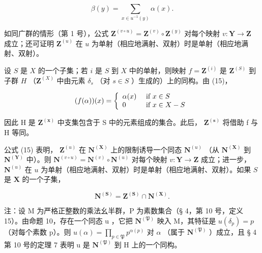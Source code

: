 \[
\beta (y) = \sum_ {x \in u ^ {- 1} (y)} \alpha (x).\tag{15}
\]

如同广群的情形（第 1 号），公式 \(\mathbf{Z}^{(v\circ u)} = \mathbf{Z}^{(v)}\circ \mathbf{Z}^{(y)}\) 对每个映射 \(v\colon \mathbf{Y}\to \mathbf{Z}\) 成立；还可证明 \(\mathbf{Z}^{(u)}\) 在 \(u\) 为单射（相应地满射、双射）时是单射（相应地满射、双射）。

设 \(S\) 是 \(X\) 的一个子集；若 \(i\) 是 \(S\) 到 \(X\) 中的单射，则映射 \(f = \mathbf{Z}^{(i)}\) 是 \(\mathbf{Z}^{(S)}\) 到子群 \(H\) （\(\mathbf{Z}^{(X)}\) 中由元素 \(\delta_s\) （对 \(s \in S\) ）生成的）上的同构。由 (15)，

\[
(f (\alpha)) (x) = \left\{ \begin{array}{l l} \alpha (x) & \text { if } x \in S \\ 0 & \text { if } x \in X - S \end{array} \right.
\]

因此 H 是 \(\mathbf{Z}^{(\mathbf{x})}\) 中支集包含于 S 中的元素组成的集合。此后， \(\mathbf{Z}^{(\mathbf{s})}\) 将借助 f 与 H 等同。

公式 (15) 表明， \(\mathbf{Z}^{(u)}\) 在 \(\mathbf{N}^{(\mathbf{X})}\) 上的限制诱导一个同态 \(\mathbf{N}^{(u)}\) （从 \(\mathbf{N}^{(\mathbf{X})}\) 到 \(\mathbf{N}^{(\mathbf{Y})}\) 中）。则 \(\mathbf{N}^{(v\circ u)} = \mathbf{N}^{(v)}\circ \mathbf{N}^{(u)}\) 对每个映射 \(v\colon \mathbf{Y}\to \mathbf{Z}\) 成立；进一步， \(\mathbf{N}^{(u)}\) 在 \(u\) 为单射（相应地满射、双射）时是单射（相应地满射、双射）。如果 \(S\) 是 \(\mathbf{X}\) 的一个子集，

\[
\mathbf {N} ^ {(\mathbf {S})} = \mathbf {Z} ^ {(\mathbf {S})} \cap \mathbf {N} ^ {(\mathbf {X})}.
\]

注：设 M 为严格正整数的乘法幺半群，P 为素数集合（§ 4，第 10 号，定义 15）。由命题 10，存在一个同态 u ，它把 \(\mathbf{N}^{(\mathfrak{P})}\) 映入 M，其特征是 \(u(\delta_{p}) = p\) （对每个素数 p）。则 \(u(\alpha) = \prod_{p \in \mathfrak{P}} p^{\alpha(p)}\) 对 \(\alpha\) （属于 \(\mathbf{N}^{(\mathfrak{P})}\) ）成立，且 § 4 第 10 号的定理 7 表明 u 是 \(\mathbf{N}^{(\mathfrak{P})}\) 到 H 上的一个同构。

